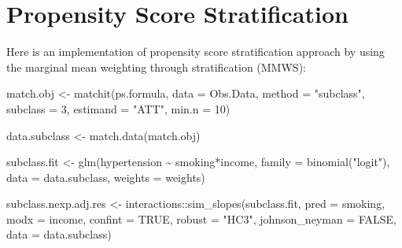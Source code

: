 \documentclass[
  letterpaper,
  DIV=11,
  numbers=noendperiod]{scrreprt}
\newenvironment{Shaded}{\begin{snugshade}}{\end{snugshade}}
\newcommand{\AttributeTok}[1]{\textcolor[rgb]{0.40,0.45,0.13}{#1}}
\newcommand{\ConstantTok}[1]{\textcolor[rgb]{0.56,0.35,0.01}{#1}}
\newcommand{\DecValTok}[1]{\textcolor[rgb]{0.68,0.00,0.00}{#1}}
\newcommand{\FunctionTok}[1]{\textcolor[rgb]{0.28,0.35,0.67}{#1}}
\newcommand{\NormalTok}[1]{\textcolor[rgb]{0.00,0.23,0.31}{#1}}
\newcommand{\OtherTok}[1]{\textcolor[rgb]{0.00,0.23,0.31}{#1}}
\newcommand{\SpecialCharTok}[1]{\textcolor[rgb]{0.37,0.37,0.37}{#1}}
\newcommand{\StringTok}[1]{\textcolor[rgb]{0.13,0.47,0.30}{#1}}
\begin{document}
\hypertarget{propensity-score-stratification-1}{%
\section{Propensity Score
Stratification}\label{propensity-score-stratification-1}}

Here is an implementation of propensity score stratification approach by
using the marginal mean weighting through stratification (MMWS):

\begin{Shaded}
\begin{Highlighting}[]
\NormalTok{match.obj }\OtherTok{\textless{}{-}} \FunctionTok{matchit}\NormalTok{(ps.formula, }\AttributeTok{data =}\NormalTok{ Obs.Data,}
                      \AttributeTok{method =} \StringTok{"subclass"}\NormalTok{, }\AttributeTok{subclass =} \DecValTok{3}\NormalTok{, }
                      \AttributeTok{estimand =} \StringTok{"ATT"}\NormalTok{, }\AttributeTok{min.n =} \DecValTok{10}\NormalTok{)}

\NormalTok{data.subclass }\OtherTok{\textless{}{-}} \FunctionTok{match.data}\NormalTok{(match.obj)}

\NormalTok{subclass.fit }\OtherTok{\textless{}{-}} \FunctionTok{glm}\NormalTok{(hypertension }\SpecialCharTok{\textasciitilde{}}\NormalTok{ smoking}\SpecialCharTok{*}\NormalTok{income, }
                    \AttributeTok{family =} \FunctionTok{binomial}\NormalTok{(}\StringTok{"logit"}\NormalTok{),}
                    \AttributeTok{data =}\NormalTok{ data.subclass,}
                    \AttributeTok{weights =}\NormalTok{ weights)}

\NormalTok{subclass.nexp.adj.res }\OtherTok{\textless{}{-}}\NormalTok{ interactions}\SpecialCharTok{::}\FunctionTok{sim\_slopes}\NormalTok{(subclass.fit, }
                                                  \AttributeTok{pred =}\NormalTok{ smoking, }
                                                  \AttributeTok{modx =}\NormalTok{ income, }
                                                  \AttributeTok{confint =} \ConstantTok{TRUE}\NormalTok{,}
                                                  \AttributeTok{robust =} \StringTok{"HC3"}\NormalTok{,}
                                                  \AttributeTok{johnson\_neyman =} \ConstantTok{FALSE}\NormalTok{,}
                                                  \AttributeTok{data =}\NormalTok{ data.subclass)}
\end{Highlighting}
\end{Shaded}
\end{document}
